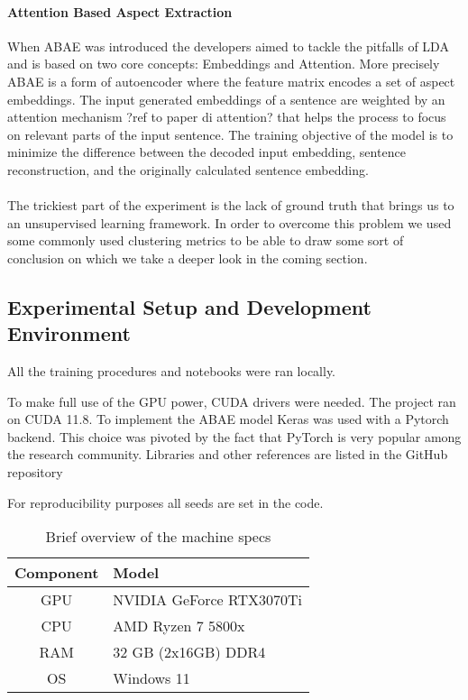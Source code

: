 \paragraph{Attention Based Aspect Extraction}
When ABAE was introduced the developers aimed to tackle the pitfalls of LDA and is based on two core concepts: Embeddings and Attention.
More precisely ABAE is a form of autoencoder where the feature matrix encodes a set of aspect embeddings.
The input generated embeddings of a sentence are weighted by an attention mechanism ?ref to paper di attention?
that helps the process to focus on relevant parts of the input sentence.
The training objective of the model is to minimize the difference between the decoded input embedding, sentence reconstruction,
and the originally calculated sentence embedding.

\paragraph{}
The trickiest part of the experiment is the lack of ground truth that brings us to an unsupervised learning framework.
In order to overcome this problem we used some commonly used clustering metrics to be able to draw some sort of conclusion on which we
take a deeper look in the coming section.

\subsection{Experimental Setup and Development Environment}
All the training procedures and notebooks were ran locally.

To make full use of the GPU power, CUDA drivers were needed. The project ran on CUDA 11.8.
To implement the ABAE model Keras was used with a Pytorch backend.
This choice was pivoted by the fact that PyTorch is very popular among the research community.
Libraries and other references are listed in the GitHub repository\cite{Fichera_Muffin_vs_Chihuahua_2024}

For reproducibility purposes all seeds are set in the code.

\begin{center}
    \begin{table}
        \begin{tabular}{|c l|}
            \hline
            Component & Model \\ [0.5ex]
            \hline\hline
            GPU       & NVIDIA GeForce RTX3070Ti \\
            \hline
            CPU       & AMD Ryzen 7 5800x        \\
            \hline
            RAM       & 32 GB (2x16GB) DDR4      \\
            \hline
            OS        & Windows 11               \\
            \hline
        \end{tabular}
        \caption{Brief overview of the machine specs}
        \label{specs}

    \end{table}

\end{center}


